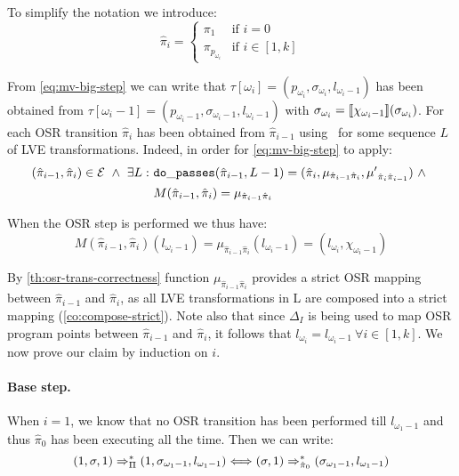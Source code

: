 \begin{myproof}
To simplify the notation we introduce:
\begin{equation*}
\hat{\pi}_i = \begin{cases}
\pi_1 & \text{if } i=0\\
\pi_{p_{\omega_i}} & \text{if } i \in [1,k]
\end{cases}
\end{equation*}

\noindent From \ref{eq:mv-big-step} we can write that $\tau[\omega_i]=(p_{\omega_i}, \sigma_{\omega_i},l_{\omega_i-1})$ has been obtained from $\tau[\omega_i-1]=(p_{\omega_i-1}, \sigma_{\omega_i-1}, l_{\omega_i-1})$ with $\sigma_{\omega_i}=[\![\chi_{\omega_i-1}]\!](\sigma_{\omega_i})$. For each OSR transition $\hat{\pi}_i$ has been obtained from $\hat{\pi}_{i-1}$ using \dopasses\ for some sequence $L$ of LVE transformations. Indeed, in order for \ref{eq:mv-big-step} to apply:
\begin{align*}
(\hat{\pi}_{i-1},\hat{\pi}_i)\in{\cal E} ~\wedge~ \exists L: ~&{\tt do\_passes}(\hat{\pi}_{i-1}, L-1)=(\hat{\pi}_i,\mu_{\hat{\pi}_{i-1}\hat{\pi}_i},{\mu'}_{\hat{\pi}_{i}\hat{\pi}_{i-1}}) ~\wedge~\\
&M(\hat{\pi}_{i-1},\hat{\pi}_i)=\mu_{\hat{\pi}_{i-1}\hat{\pi}_i}
\end{align*}

\noindent When the OSR step is performed we thus have:
\begin{equation*}
M(\hat{\pi}_{i-1},\hat{\pi}_i)(l_{\omega_i-1})=\mu_{\hat{\pi}_{i-1}\hat{\pi}_i}(l_{\omega_i-1})=(l_{\omega_i},\chi_{\omega_i-1})
\end{equation*}

\noindent By \ref{th:osr-trans-correctness} function $\mu_{\hat{\pi}_{i-1}\hat{\pi}_i}$ provides a strict OSR mapping between $\hat{\pi}_{i-1}$ and $\hat{\pi}_i$, as all LVE transformations in L are composed into a strict mapping (\ref{co:compose-strict}). Note also that since $\Delta_I$ is being used to map OSR program points between $\hat{\pi}_{i-1}$ and $\hat{\pi}_i$, it follows that $l_{\omega_i}=l_{\omega_i-1}~\forall i\in[1,k]$.
We now prove our claim by induction on $i$.

\paragraph*{Base step.} When $i=1$, we know that no OSR transition has been performed till $l_{\omega_1-1}$ and thus $\hat{\pi}_0$ has been executing all the time. Then we can write:
\begin{equation*}
(1, \sigma, 1)\Rightarrow^*_{\Pi}(1,\sigma_{\omega_1-1},l_{\omega_1-1}) \Longleftrightarrow (\sigma, 1) \Rightarrow^*_{\hat{\pi}_0} (\sigma_{\omega_1-1},l_{\omega_1-1})
\end{equation*}


\end{myproof}
